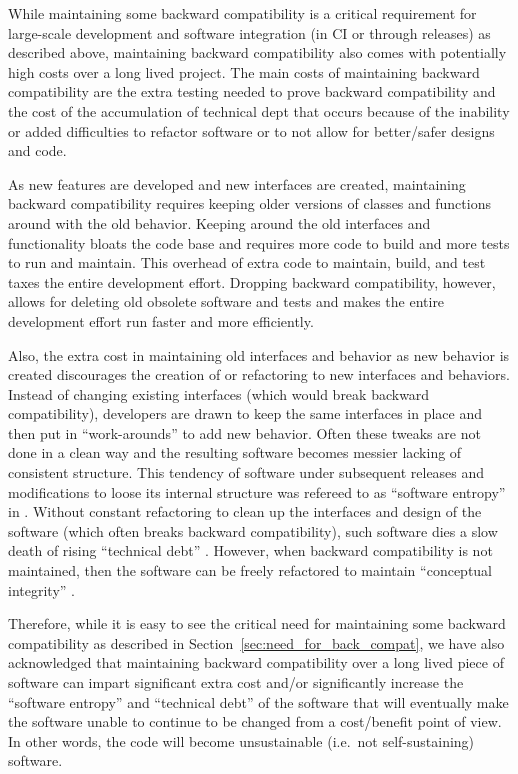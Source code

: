 \documentclass[11pt]{SANDreport}
\begin{document}
While maintaining some backward compatibility is a critical
requirement for large-scale development and software integration (in
CI or through releases) as described above, maintaining backward
compatibility also comes with potentially high costs over a long lived
project.  The main costs of maintaining backward compatibility are the
extra testing needed to prove backward compatibility and the cost of
the accumulation of technical dept that occurs because of the
inability or added difficulties to refactor software or to not allow
for better/safer designs and code.

As new features are developed and new interfaces are created,
maintaining backward compatibility requires keeping older versions of
classes and functions around with the old behavior.  Keeping around the
old interfaces and functionality bloats the code base and requires
more code to build and more tests to run and maintain.  This overhead
of extra code to maintain, build, and test taxes the entire
development effort.  Dropping backward compatibility, however, allows
for deleting old obsolete software and tests and makes the entire
development effort run faster and more efficiently.

Also, the extra cost in maintaining old interfaces and behavior as new
behavior is created discourages the creation of or refactoring to new
interfaces and behaviors.  Instead of changing existing interfaces
(which would break backward compatibility), developers are drawn to
keep the same interfaces in place and then put in ``work-arounds'' to
add new behavior.  Often these tweaks are not done in a clean way and
the resulting software becomes messier lacking of consistent
structure.  This tendency of software under subsequent releases and
modifications to loose its internal structure was refereed to as
``software entropy'' in {}\cite{MythicalManMonth95}.  Without constant
refactoring to clean up the interfaces and design of the software
(which often breaks backward compatibility), such software dies a slow
death of rising ``technical debt''
{}\cite{ImplementingLeanSoftwareDevelopment}.  However, when backward
compatibility is not maintained, then the software can be freely
refactored to maintain ``conceptual integrity''
{}\cite{MythicalManMonth95}.

Therefore, while it is easy to see the critical need for maintaining
some backward compatibility as described in
Section~\ref{sec:need_for_back_compat}, we have also acknowledged that
maintaining backward compatibility over a long lived piece of software
can impart significant extra cost and/or significantly increase the
``software entropy'' and ``technical debt'' of the software that will
eventually make the software unable to continue to be changed from a
cost/benefit point of view.  In other words, the code will become
unsustainable (i.e.\ not self-sustaining) software.
\end{document}
